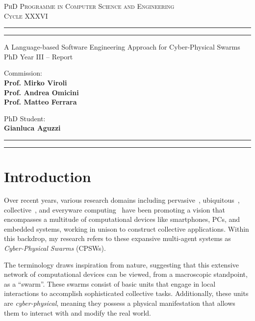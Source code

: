 \documentclass[11pt]{article}
\begin{document}
\sloppy
\begin{center}
	{{
		\Large{
			\textsc{PhD Programme in Computer Science and Engineering \\ 
			\vspace{4mm}
			Cycle XXXVI}
			}
	}} 
	\rule[0.1cm]{\textwidth}{0.1mm}
	\rule[0.4cm]{\textwidth}{0.6mm}
\end{center}

\begin{center}
	{\LARGE{A Language-based Software Engineering Approach for Cyber-Physical Swarms}} \\
	\vspace{4mm}
	{\large{PhD Year III -- Report}} 
	\vspace{4mm}
\end{center}
\vspace{8mm}
\par
\noindent
\begin{minipage}[t]{0.47\textwidth}

{\large{Commission: \\\bf
Prof. Mirko Viroli \\
Prof. Andrea Omicini \\
Prof. Matteo Ferrara} 
}
\end{minipage}
\hfill
\begin{minipage}[t]{0.47\textwidth}
	\raggedleft
	{
		\large{PhD Student: \\\bf Gianluca Aguzzi}
	}
\end{minipage}
\vspace{10mm}

{
	\raggedright
	\rule[0.1cm]{\textwidth}{0.6mm}
	\rule[0.5cm]{\textwidth}{0.1mm}
}

\newcommand{\rev}[1]{{
	#1
	}}
\section{Introduction}
Over recent years, various research domains including pervasive~\cite{pervasive}, ubiquitous~\cite{weiser1999computer}, collective~\cite{abowd2016beyond}, and everyware computing~\cite{greenfield2010everyware} have been promoting a vision 
 that encompasses a multitude of computational devices like smartphones, 
 PCs, and embedded systems, working in unison to construct collective applications. 
Within this backdrop, my research refers to these expansive multi-agent systems as \textit{Cyber-Physical Swarms} (CPSWs).

The terminology draws inspiration from nature, 
 suggesting that this extensive network of computational devices can be viewed, 
 from a macroscopic standpoint, as a ``swarm''. 
% 
These swarms consist of basic units that engage in local interactions to accomplish sophisticated collective tasks. 
 Additionally, these units are \textit{cyber-physical}, 
 meaning they possess a physical manifestation that allows them to interact with and modify the real world.
\end{document}

